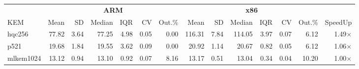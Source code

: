 \begin{table}[!ht]
\centering
\begin{tabular}{l|rrrrrr|rrrrrr|r}
\toprule
& \multicolumn{6}{c}{\bfseries ARM} & \multicolumn{6}{c}{\bfseries x86} & \\
\cmidrule(lr){2-7} \cmidrule(lr){8-13}
KEM & Mean & SD & Median & IQR & CV & Out.\% & Mean & SD & Median & IQR & CV & Out.\% & SpeedUp \\
\midrule
hqc256 & 77.82 & 3.64 & 77.25 & 4.98 & 0.05 & 0.00 & 116.31 & 7.84 & 114.05 & 3.97 & 0.07 & 6.12 & 1.49× \\
p521 & 19.68 & 1.84 & 19.55 & 3.62 & 0.09 & 0.00 & 20.92 & 1.14 & 20.67 & 0.82 & 0.05 & 6.12 & 1.06× \\
mlkem1024 & 13.12 & 0.94 & 13.10 & 0.92 & 0.07 & 8.16 & 13.17 & 0.51 & 13.04 & 0.34 & 0.04 & 10.20 & 1.00× \\
\bottomrule
\end{tabular}
\end{table}
